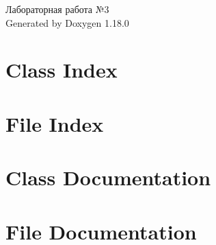 \documentclass[twoside]{book}
\newcommand{\+}{\discretionary{\mbox{\scriptsize$\hookleftarrow$}}{}{}}
\newcommand{\clearemptydoublepage}{%
    \newpage{\pagestyle{empty}\cleardoublepage}%
  }
\begin{document}
  \raggedbottom
    \hypersetup{pageanchor=false,
                bookmarksnumbered=true,
                pdfencoding=unicode
               }
  \begin{titlepage}
  \vspace*{7cm}
  \begin{center}%
  {\Large Лабораторная работа №3}\\
  \vspace*{1cm}
  {\large Generated by Doxygen 1.18.0}\\
  \end{center}
  \end{titlepage}
  \clearemptydoublepage
  \tableofcontents
  \clearemptydoublepage
  \hypersetup{pageanchor=true}
\chapter{Class Index}

\chapter{File Index}

\chapter{Class Documentation}


\chapter{File Documentation}




  \backmatter
  \newpage
  \clearemptydoublepage
  \printindex
\end{document}
